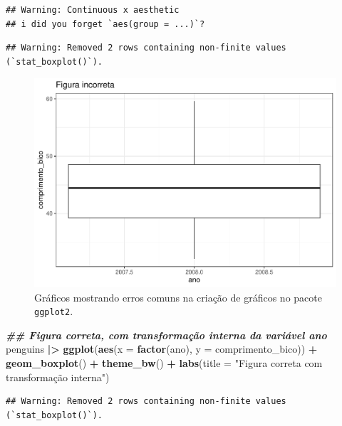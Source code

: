 \documentclass[
]{article}
\newenvironment{Shaded}{\begin{snugshade}}{\end{snugshade}}
\newcommand{\AttributeTok}[1]{\textcolor[rgb]{0.13,0.29,0.53}{#1}}
\newcommand{\DocumentationTok}[1]{\textcolor[rgb]{0.56,0.35,0.01}{\textbf{\textit{#1}}}}
\newcommand{\FunctionTok}[1]{\textcolor[rgb]{0.13,0.29,0.53}{\textbf{#1}}}
\newcommand{\NormalTok}[1]{#1}
\newcommand{\SpecialCharTok}[1]{\textcolor[rgb]{0.81,0.36,0.00}{\textbf{#1}}}
\newcommand{\StringTok}[1]{\textcolor[rgb]{0.31,0.60,0.02}{#1}}
\begin{document}
\begin{verbatim}
## Warning: Continuous x aesthetic
## i did you forget `aes(group = ...)`?
\end{verbatim}

\begin{verbatim}
## Warning: Removed 2 rows containing non-finite values (`stat_boxplot()`).
\end{verbatim}

\begin{figure}
\centering
\includegraphics{epr_files/figure-latex/fig-plot-error-1.pdf}
\caption{\label{fig:fig-plot-error-1}Gráficos mostrando erros comuns na criação de gráficos no pacote \texttt{ggplot2}.}
\end{figure}

\begin{Shaded}
\begin{Highlighting}[]
\DocumentationTok{\#\# Figura correta, com transformação interna da variável ano}
\NormalTok{penguins }\SpecialCharTok{|\textgreater{}}
    \FunctionTok{ggplot}\NormalTok{(}\FunctionTok{aes}\NormalTok{(}\AttributeTok{x =} \FunctionTok{factor}\NormalTok{(ano), }\AttributeTok{y =}\NormalTok{ comprimento\_bico)) }\SpecialCharTok{+}
    \FunctionTok{geom\_boxplot}\NormalTok{() }\SpecialCharTok{+} 
    \FunctionTok{theme\_bw}\NormalTok{() }\SpecialCharTok{+}
    \FunctionTok{labs}\NormalTok{(}\AttributeTok{title =} \StringTok{"Figura correta com transformação interna"}\NormalTok{)}
\end{Highlighting}
\end{Shaded}

\begin{verbatim}
## Warning: Removed 2 rows containing non-finite values (`stat_boxplot()`).
\end{verbatim}
\end{document}
